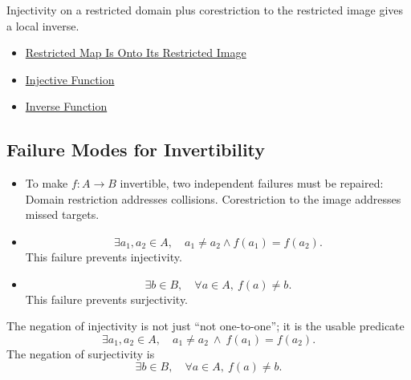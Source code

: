\begin{remark*}[Interpretation]
Injectivity on a restricted domain plus corestriction to the restricted image
gives a local inverse.
\end{remark*}

\begin{dependencies}
\begin{itemize}
  \item \hyperref[prop:restricted-map-onto-image]{Restricted Map Is Onto Its Restricted Image}
  \item \hyperref[def:injective]{Injective Function}
  \item \hyperref[def:inverse]{Inverse Function}
\end{itemize}
\end{dependencies}

\subsection*{Failure Modes for Invertibility}

\begin{remark*}
\begin{itemize}
\item[Exposition.]
To make $f:A\to B$ invertible, two independent failures must be repaired:
Domain restriction addresses collisions. Corestriction to the image addresses
missed targets.
\item[Collision failure.]
\[
  \exists a_1,a_2\in A,\quad a_1\neq a_2\wedge f(a_1)=f(a_2).
\]
This failure prevents injectivity.
\item[Missed-target failure.]
\[
  \exists b\in B,\quad \forall a\in A,\ f(a)\neq b.
\]
This failure prevents surjectivity.
\end{itemize}
\end{remark*}

\begin{remark*}
The negation of injectivity is not just ``not one-to-one''; it is the usable
predicate
\[
\exists a_1,a_2\in A,\quad a_1\neq a_2\ \land\ f(a_1)=f(a_2).
\]
The negation of surjectivity is
\[
\exists b\in B,\quad \forall a\in A,\ f(a)\neq b.
\]
\end{remark*}
